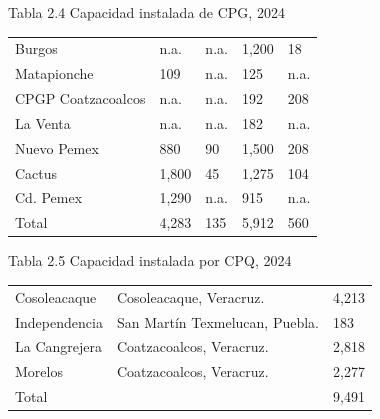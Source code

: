 \documentclass{sener2025}
\begin{document}
\begin{tabladoradoCorto}
  \caption{Tabla 2.4 Capacidad instalada de CPG, 2024}
  \label{tab:tabla_2_4_capacidad_instalada_}
  \begin{tabularx}{\textwidth}{Vvvvv}
    \toprule
      &  &  &  &  \\
    \midrule
    Burgos & n.a. & n.a. & 1,200 & 18 \\
    Matapionche & 109 & n.a. & 125 & n.a. \\
    CPGP Coatzacoalcos & n.a. & n.a. & 192 & 208 \\
    La Venta & n.a. & n.a. & 182 & n.a. \\
    Nuevo Pemex & 880 & 90 & 1,500 & 208 \\
    Cactus & 1,800 & 45 & 1,275 & 104 \\
    Cd. Pemex & 1,290 & n.a. & 915 & n.a. \\
    Total & 4,283 & 135 & 5,912 & 560 \\
    \bottomrule
  \end{tabularx}
\end{tabladoradoCorto}
\vspace{-4pt}

\begin{tabladoradoCorto}
  \caption{Tabla 2.5 Capacidad instalada por CPQ, 2024}
  \label{tab:tabla_2_5_capacidad_instalada_}
  \begin{tabularx}{\textwidth}{Vvv}
    \toprule
      &  &  \\
    \midrule
    Cosoleacaque & Cosoleacaque, Veracruz. & 4,213 \\
    Independencia & San Martín Texmelucan, Puebla. & 183 \\
    La Cangrejera & Coatzacoalcos, Veracruz. & 2,818 \\
    Morelos & Coatzacoalcos, Veracruz. & 2,277 \\
    Total &  & 9,491 \\
    \bottomrule
  \end{tabularx}
\end{tabladoradoCorto}
\vspace{-4pt}
\end{document}
